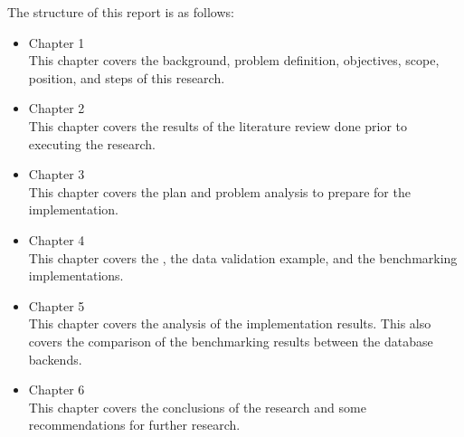 The structure of this report is as follows:

\begin{itemize}
    \item Chapter 1 \babSatu \\
        This chapter covers the background, problem definition, objectives,
        scope, position, and steps of this research.
    \item Chapter 2 \babDua \\
        This chapter covers the results of the literature review done prior to
        executing the research.
    \item Chapter 3 \babTiga \\
        This chapter covers the plan and problem analysis to prepare for the
        implementation.
    \item Chapter 4 \babEmpat \\
        This chapter covers the , the data validation example,
        and the benchmarking implementations.
    \item Chapter 5 \babLima \\
        This chapter covers the analysis of the implementation results. This
        also covers the comparison of the benchmarking results between the
        database backends.
    \item Chapter 6 \kesimpulan \\
        This chapter covers the conclusions of the research and some
        recommendations for further research.
\end{itemize}
